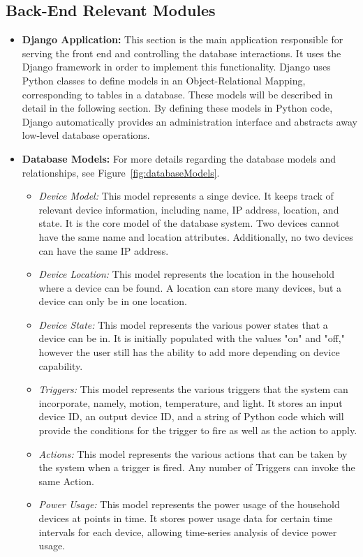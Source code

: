 \documentclass[10pt,twocolumn]{witseiepaper}
\begin{document}
	\subsection{Back-End Relevant Modules}
	\begin{itemize}
		\item \textbf{Django Application:} This section is the main application responsible for serving the front end and controlling the database interactions. It uses the Django framework in order to implement this functionality. Django uses Python classes to define models in an Object-Relational Mapping, corresponding to tables in a database. These models will be described in detail in the following section. By defining these models in Python code, Django automatically provides an administration interface and abstracts away low-level database operations.
		\item \textbf{Database Models:} 
		For more details regarding the database models and relationships, see Figure~\ref{fig:databaseModels}.
		\begin{itemize}
			\item \textit{Device Model:} This model represents a singe device. It keeps track of relevant device information, including name, IP address, location, and state. It is the core model of the database system. Two devices cannot have the same name and location attributes. Additionally, no two devices can have the same IP address. 
			\item \textit{Device Location:} This model represents the location in the household where a device can be found. A location can store many devices, but a device can only be in one location. 
			\item \textit{Device State:} This model represents the various power states that a device can be in. It is initially populated with the values "on" and "off," however the user still has the ability to add more depending on device capability. 
			\item \textit{Triggers:} This model represents the various triggers that the system can incorporate, namely, motion, temperature, and light. 
			It stores an input device ID, an output device ID, and a string of Python code which will provide the conditions for the trigger to fire as well as the action to apply.
			\item \textit{Actions:}  This model represents the various actions that can be taken by the system when a trigger is fired. Any number of Triggers can invoke the same Action.
			\item \textit{Power Usage:} This model represents the power usage of the household devices at points in time. It stores power usage data for certain time intervals for each device, allowing time-series analysis of device power usage.

\end{itemize}
\end{itemize}
\end{document}
